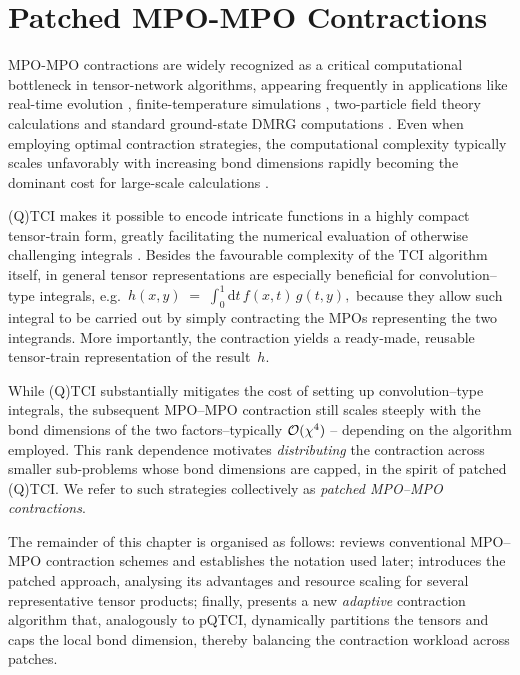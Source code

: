 \chapter{Patched MPO-MPO Contractions}
\label{chap:MPOcontr}
MPO-MPO contractions are widely recognized as a critical computational bottleneck in tensor-network algorithms, appearing frequently in applications like real-time evolution \cite{Paeckel2019}, finite-temperature simulations \cite{Verstraete2004}, two-particle field theory calculations \cite{Rohshap2025} and standard ground-state DMRG computations \cite{Schollwock2011}. Even when employing optimal contraction strategies, the computational complexity typically scales unfavorably with increasing bond dimensions rapidly becoming the dominant cost for large-scale calculations \cite{Schollwock2011,Rohshap2025,Paeckel2019}.

(Q)TCI makes it possible to encode intricate functions in a highly compact tensor‐train form, greatly facilitating the numerical evaluation of otherwise challenging integrals \cite{Fernandez2022,Fernandez2024,Rohshap2025}.  
Besides the favourable complexity of the TCI algorithm itself, in general tensor representations are especially beneficial for convolution–type integrals, e.g.\ $h(x,y)\;=\;\int_{0}^{1}\! \mathrm{d}t\,f(x,t)\,g(t,y),$
because they allow such integral to be carried out by simply contracting the MPOs representing the two integrands. More importantly, the contraction yields a ready‐made, reusable tensor‐train representation of the result~\(h\).

While (Q)TCI substantially mitigates the cost of setting up convolution–type integrals, the subsequent MPO–MPO contraction still scales steeply with the bond dimensions of the two factors--typically $\mathcal{O}(\chi^{4})$ \cite{Stoudenmire2010}-- depending on the algorithm employed.  This rank dependence motivates \emph{distributing} the contraction across smaller sub-problems whose bond dimensions are capped, in the spirit of
patched (Q)TCI.  We refer to such strategies collectively as \emph{patched MPO–MPO contractions}.

The remainder of this chapter is organised as follows:  reviews conventional MPO–MPO contraction schemes and establishes the notation used later;   introduces the patched approach, analysing its advantages and resource scaling for several representative tensor products; finally,  presents a new \emph{adaptive} contraction algorithm that, analogously to pQTCI, dynamically partitions the tensors and caps the local bond dimension, thereby balancing the contraction workload across patches.

